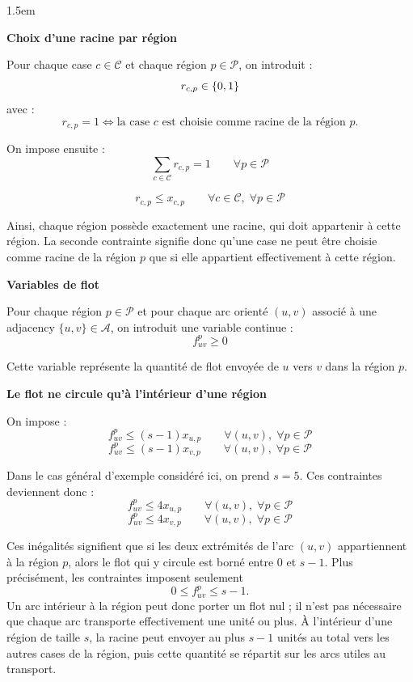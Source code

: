 \par
\begin{adjustwidth}{1.5em}{}

\noindent\textbf{Choix d'une racine par région}
\par

Pour chaque case \(c \in \mathcal{C}\) et chaque région \(p \in \mathcal{P}\), on introduit :
\[
r_{c,p} \in \{0,1\}
\]
avec :
\[
r_{c,p} = 1 \iff \text{la case } c \text{ est choisie comme racine de la région } p.
\]

On impose ensuite :
\[
\sum_{c \in \mathcal{C}} r_{c,p} = 1
\qquad \forall p \in \mathcal{P}
\]

\[
r_{c,p} \leq x_{c,p}
\qquad \forall c \in \mathcal{C},\; \forall p \in \mathcal{P}
\]

Ainsi, chaque région possède exactement une racine, qui doit appartenir à cette région. La seconde contrainte signifie donc qu'une case ne peut être choisie comme racine de la région \(p\) que si elle appartient effectivement à cette région.

\par
\noindent\textbf{Variables de flot}
\par

Pour chaque région \(p \in \mathcal{P}\) et pour chaque arc orienté \((u,v)\) associé à une adjacency \(\{u,v\} \in \mathcal{A}\), on introduit une variable continue :
\[
f^{p}_{uv} \geq 0
\]

Cette variable représente la quantité de flot envoyée de \(u\) vers \(v\) dans la région \(p\).

\par
\noindent\textbf{Le flot ne circule qu'à l'intérieur d'une région}
\par

On impose :
\[
f^{p}_{uv} \leq (s-1)x_{u,p}
\qquad \forall (u,v),\; \forall p \in \mathcal{P}
\]
\[
f^{p}_{uv} \leq (s-1)x_{v,p}
\qquad \forall (u,v),\; \forall p \in \mathcal{P}
\]

Dans le cas général d'exemple considéré ici, on prend \(s = 5\). Ces contraintes deviennent donc :
\[
f^{p}_{uv} \leq 4x_{u,p}
\qquad \forall (u,v),\; \forall p \in \mathcal{P}
\]
\[
f^{p}_{uv} \leq 4x_{v,p}
\qquad \forall (u,v),\; \forall p \in \mathcal{P}
\]

Ces inégalités signifient que si les deux extrémités de l'arc \((u,v)\) appartiennent à la région \(p\), alors le flot qui y circule est borné entre \(0\) et \(s-1\). Plus précisément, les contraintes imposent seulement
\[
0 \leq f^{p}_{uv} \leq s-1.
\]
Un arc intérieur à la région peut donc porter un flot nul ; il n'est pas nécessaire que chaque arc transporte effectivement une unité ou plus. À l'intérieur d'une région de taille \(s\), la racine peut envoyer au plus \(s-1\) unités au total vers les autres cases de la région, puis cette quantité se répartit sur les arcs utiles au transport.


\end{adjustwidth}
